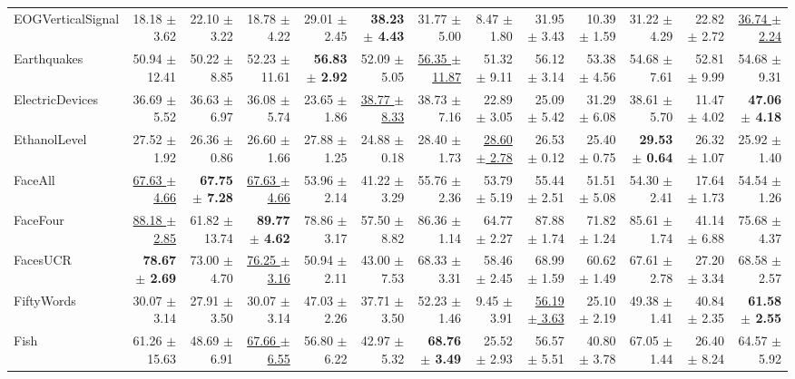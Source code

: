 \begin{landscape}
\begin{longtable}{lrrrrrrrrrrrr}
EOGVerticalSignal & 18.18 $\pm$ 3.62 & 22.10 $\pm$ 3.22 & 18.78 $\pm$ 4.22 & 29.01 $\pm$ 2.45 & \textbf{38.23 $\pm$ 4.43} & 31.77 $\pm$ 5.00 & 8.47 $\pm$ 1.80 & 31.95 $\pm$ 3.43 & 10.39 $\pm$ 1.59 & 31.22 $\pm$ 4.29 & 22.82 $\pm$ 2.72 & \underline{36.74 $\pm$ 2.24} \\
Earthquakes & 50.94 $\pm$ 12.41 & 50.22 $\pm$ 8.85 & 52.23 $\pm$ 11.61 & \textbf{56.83 $\pm$ 2.92} & 52.09 $\pm$ 5.05 & \underline{56.35 $\pm$ 11.87} & 51.32 $\pm$ 9.11 & 56.12 $\pm$ 3.14 & 53.38 $\pm$ 4.56 & 54.68 $\pm$ 7.61 & 52.81 $\pm$ 9.99 & 54.68 $\pm$ 9.31 \\
ElectricDevices & 36.69 $\pm$ 5.52 & 36.63 $\pm$ 6.97 & 36.08 $\pm$ 5.74 & 23.65 $\pm$ 1.86 & \underline{38.77 $\pm$ 8.33} & 38.73 $\pm$ 7.16 & 22.89 $\pm$ 3.05 & 25.09 $\pm$ 5.42 & 31.29 $\pm$ 6.08 & 38.61 $\pm$ 5.70 & 11.47 $\pm$ 4.02 & \textbf{47.06 $\pm$ 4.18} \\
EthanolLevel & 27.52 $\pm$ 1.92 & 26.36 $\pm$ 0.86 & 26.60 $\pm$ 1.66 & 27.88 $\pm$ 1.25 & 24.88 $\pm$ 0.18 & 28.40 $\pm$ 1.73 & \underline{28.60 $\pm$ 2.78} & 26.53 $\pm$ 0.12 & 25.40 $\pm$ 0.75 & \textbf{29.53 $\pm$ 0.64} & 26.32 $\pm$ 1.07 & 25.92 $\pm$ 1.40 \\
FaceAll & \underline{67.63 $\pm$ 4.66} & \textbf{67.75 $\pm$ 7.28} & \underline{67.63 $\pm$ 4.66} & 53.96 $\pm$ 2.14 & 41.22 $\pm$ 3.29 & 55.76 $\pm$ 2.36 & 53.79 $\pm$ 5.19 & 55.44 $\pm$ 2.51 & 51.51 $\pm$ 5.08 & 54.30 $\pm$ 2.41 & 17.64 $\pm$ 1.73 & 54.54 $\pm$ 1.26 \\
FaceFour & \underline{88.18 $\pm$ 2.85} & 61.82 $\pm$ 13.74 & \textbf{89.77 $\pm$ 4.62} & 78.86 $\pm$ 3.17 & 57.50 $\pm$ 8.82 & 86.36 $\pm$ 1.14 & 64.77 $\pm$ 2.27 & 87.88 $\pm$ 1.74 & 71.82 $\pm$ 1.24 & 85.61 $\pm$ 1.74 & 41.14 $\pm$ 6.88 & 75.68 $\pm$ 4.37 \\
FacesUCR & \textbf{78.67 $\pm$ 2.69} & 73.00 $\pm$ 4.70 & \underline{76.25 $\pm$ 3.16} & 50.94 $\pm$ 2.11 & 43.00 $\pm$ 7.53 & 68.33 $\pm$ 3.31 & 58.46 $\pm$ 2.45 & 68.99 $\pm$ 1.59 & 60.62 $\pm$ 1.49 & 67.61 $\pm$ 2.78 & 27.20 $\pm$ 3.34 & 68.58 $\pm$ 2.57 \\
FiftyWords & 30.07 $\pm$ 3.14 & 27.91 $\pm$ 3.50 & 30.07 $\pm$ 3.14 & 47.03 $\pm$ 2.26 & 37.71 $\pm$ 3.50 & 52.23 $\pm$ 1.46 & 9.45 $\pm$ 3.91 & \underline{56.19 $\pm$ 3.63} & 25.10 $\pm$ 2.19 & 49.38 $\pm$ 1.41 & 40.84 $\pm$ 2.35 & \textbf{61.58 $\pm$ 2.55} \\
Fish & 61.26 $\pm$ 15.63 & 48.69 $\pm$ 6.91 & \underline{67.66 $\pm$ 6.55} & 56.80 $\pm$ 6.22 & 42.97 $\pm$ 5.32 & \textbf{68.76 $\pm$ 3.49} & 25.52 $\pm$ 2.93 & 56.57 $\pm$ 5.51 & 40.80 $\pm$ 3.78 & 67.05 $\pm$ 1.44 & 26.40 $\pm$ 8.24 & 64.57 $\pm$ 5.92 \\

\end{longtable}
\end{landscape}
